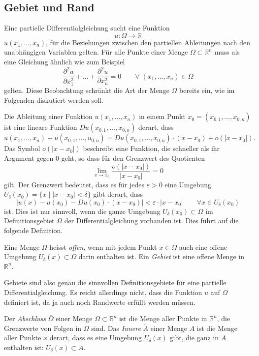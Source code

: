 \subsection{Gebiet und Rand
\label{subsection:pde:gebiet}}
Eine partielle Differentialgleichung sucht eine Funktion
\[
u\colon \Omega\to\mathbb R
\]
$u(x_1,\dots,x_n)$, für die Beziehungen zwischen den partiellen
Ableitungen nach den unabhängigen Variablen gelten.
Für alle Punkte einer Menge $\Omega\subset\mathbb R^n$ muss
als eine Gleichung ähnlich wie zum Beispiel
\[
\frac{\partial^2 u}{\partial x_1^2}
+
\dots
+
\frac{\partial^2 u}{\partial x_n^2}
=
0
\qquad
\forall \;
(x_1,\dots,x_n)\in \Omega
\]
gelten.
Diese Beobachtung schränkt die Art der Menge $\Omega$ bereits ein,
wie im Folgenden diskutiert werden soll.

Die Ableitung einer Funktion $u(x_1,\dots,x_n)$ in einem Punkt
$x_0=(x_{0,1},\dots,x_{0,n})$ ist eine lineare Funktion 
$Du(x_{0,1},\dots,x_{0,n}) $ derart, dass
\[
u(x_1,\dots,x_n) - u(x_{0,1},\dots,u_{0,n})
=
Du(x_{0,1},\dots,x_{0,n})\cdot (x-x_0) + o(|x-x_0|).
\]
Das Symbol $o(|x-x_0|)$ beschreibt eine Funktion, die schneller als
ihr Argument gegen $0$ geht, so dass für den Grenzwert des
Quotienten 
\[
\lim_{x\to x_0}\frac{o(|x-x_0|)}{|x-x_0|} = 0
\]
gilt.
Der Grenzwert bedeutet, dass es für jedes $\varepsilon>0$ eine Umgebung
$U_\delta(x_0)=\{x\;|\; |x-x_0|<\delta\}$ gibt derart, dass
\[
\bigl|
u(x)-u(x_0) - Du(x_0)\cdot (x-x_0)
\bigr|
< \varepsilon\cdot |x-x_0|
\qquad\forall x\in U_\delta(x_0)
\]
ist.
Dies ist nur sinnvoll, wenn die ganze Umgebung $U_{\delta}(x_0)\subset \Omega$
im Definitionsgebiet $\Omega$ der Differentialgleichung vorhanden ist.
Dies führt auf die folgende Definition.

\begin{definition}
Eine Menge $\Omega$ heisst {\em offen}, wenn mit jedem Punkt $x\in \Omega$
auch eine offene Umgebung $U_{\delta}(x)\subset\Omega$ darin enthalten ist.
Ein {\em Gebiet} ist eine offene Menge in $\mathbb R^n$.
\end{definition}

Gebiete sind also genau die sinnvollen Definitionsgebiete für eine partielle
Differentialgleichung.
Es reicht allerdings nicht, dass die Funktion $u$ auf $\Omega$ definiert
ist, da ja auch noch Randwerte erfüllt werden müssen.

\begin{definition}
Der {\em Abschluss} $\bar{\Omega}$ einer Menge $\Omega\subset\mathbb R^n$ ist
die Menge aller Punkte in $\mathbb R^n$, die Grenzwerte von Folgen in
$\Omega$ sind.
Das {\em Innere} $\mathring{A}$ einer Menge $A$ ist die Menge aller Punkte
$x$ derart, dass es eine Umgebung $U_\delta(x)$ gibt, die ganz in $A$
enthalten ist: $U_{\delta}(x)\subset A$.
\end{definition}


